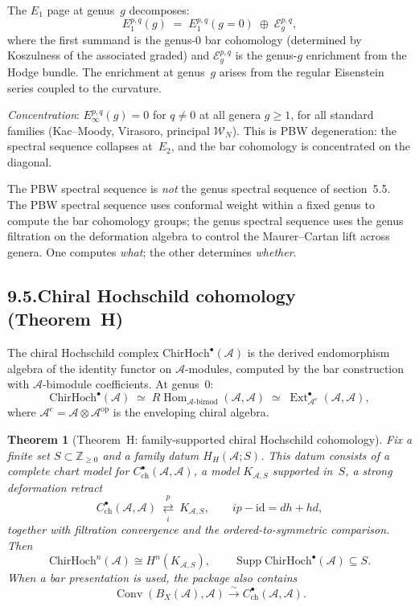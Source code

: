 \documentclass[11pt]{report}
\newtheorem{theorem}{Theorem}[section]
\theoremstyle{definition}
\theoremstyle{remark}
\providecommand{\cA}{\mathcal{A}}
\providecommand{\cE}{\mathcal{E}}
\numberwithin{equation}{section}
\begin{document}
The $E_1$ page at genus~$g$ decomposes:
\[
E_1^{p,q}(g)
\;=\;
E_1^{p,q}(g{=}0)
\;\oplus\;
\cE^{p,q}_g,
\]
where the first summand is the genus-$0$ bar cohomology (determined
by Koszulness of the associated graded) and $\cE^{p,q}_g$ is the
genus-$g$ enrichment from the Hodge bundle. The enrichment at
genus~$g$ arises from the regular Eisenstein series coupled to the
curvature.

\emph{Concentration}: $E_\infty^{p,q}(g)=0$ for $q\neq 0$ at all
genera $g\ge 1$, for all standard families
(Kac--Moody, Virasoro, principal $\mathcal W_N$). This is PBW
degeneration: the spectral sequence collapses at~$E_2$, and the
bar cohomology is concentrated on the diagonal.

The PBW spectral sequence is \emph{not} the genus spectral sequence
of section~5.5. The PBW spectral sequence uses conformal weight
within a fixed genus to compute the bar cohomology groups; the genus
spectral sequence uses the genus filtration on the deformation
algebra to control the Maurer--Cartan lift across genera. One
computes \emph{what}; the other determines \emph{whether}.


\subsection*{9.5.\quad Chiral Hochschild cohomology (Theorem~H)}

The chiral Hochschild complex $\mathrm{ChirHoch}^\bullet(\cA)$ is
the derived endomorphism algebra of the identity functor on
$\cA$-modules, computed by the bar construction with
$\cA$-bimodule coefficients. At genus~$0$:
\[
\mathrm{ChirHoch}^\bullet(\cA)
\;\simeq\;
R\!\operatorname{Hom}_{\cA\text{-bimod}}(\cA,\cA)
\;\simeq\;
\operatorname{Ext}^\bullet_{\cA^e}(\cA,\cA),
\]
where $\cA^e=\cA\otimes\cA^{\mathrm{op}}$ is the enveloping
chiral algebra.

\begin{theorem}[Theorem~H: family-supported chiral Hochschild
cohomology]\label{thm:svy-theorem-h}
Fix a finite set \(S\subset\mathbb Z_{\ge0}\) and a family datum
\(H_H(\cA;S)\).  This datum consists of a complete chart model for
\(C^\bullet_{\mathrm{ch}}(\cA,\cA)\), a model \(K_{\cA,S}\) supported
in~\(S\), a strong deformation retract
\[
C^\bullet_{\mathrm{ch}}(\cA,\cA)
\ \underset{i}{\overset{p}{\rightleftarrows}}\
K_{\cA,S},
\qquad
ip-\mathrm{id}=dh+hd,
\]
together with filtration convergence and the ordered-to-symmetric
comparison.  Then
\[
\mathrm{ChirHoch}^n(\cA)\cong H^n(K_{\cA,S}),\qquad
\operatorname{Supp}\mathrm{ChirHoch}^\bullet(\cA)\subseteq S.
\]
When a bar presentation is used, the package also contains
\[
\operatorname{Conv}(B_X(\cA),\cA)
\xrightarrow{\sim}C^\bullet_{\mathrm{ch}}(\cA,\cA).
\]
\end{theorem}
\end{document}
